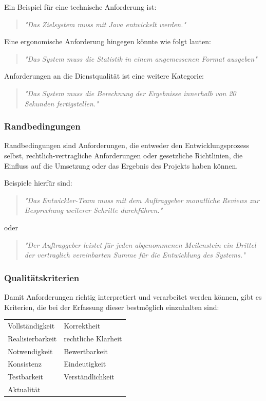 Ein Beispiel für eine technische Anforderung ist:
\begin{quote}
\textit{"Das Zielsystem muss mit Java entwickelt werden."}
\end{quote}
Eine ergonomische Anforderung hingegen könnte wie folgt lauten:
\begin{quote}
\textit{"Das System muss die Statistik in einem angemessenen Format ausgeben"}
\end{quote}

Anforderungen an die Dienstqualität ist eine weitere Kategorie:
\begin{quote}
\textit{"Das System muss die Berechnung der Ergebnisse innerhalb von 20 Sekunden fertigstellen."}
\end{quote}


\subsubsection{Randbedingungen}
\label{subsubsec:randbedingungen}
Randbedingungen sind Anforderungen, die entweder den Entwicklungsprozess selbst, rechtlich-vertragliche Anforderungen oder gesetzliche Richtlinien, die Einfluss auf die Umsetzung oder das Ergebnis des Projekts haben können.

Beispiele hierfür sind:
\begin{quote}
\textit{"Das Entwickler-Team muss mit dem Auftraggeber monatliche Reviews zur Besprechung weiterer Schritte durchführen."}
\end{quote}
oder
\begin{quote}
\textit{"Der Auftraggeber leistet für jeden abgenommenen
Meilenstein ein Drittel der vertraglich vereinbarten Summe für die
Entwicklung des Systems."}
\end{quote}

\subsubsection{Qualitätskriterien}
Damit Anforderungen richtig interpretiert und verarbeitet werden können, gibt es Kriterien, die bei der Erfassung dieser bestmöglich einzuhalten sind: \\

\begin{tabular}{l l}
Vollständigkeit		&Korrektheit\\
Realisierbarkeit		&rechtliche Klarheit\\
Notwendigkeit		&Bewertbarkeit\\
Konsistenz			&Eindeutigkeit\\
Testbarkeit			&Verständlichkeit\\
Aktualität
\end{tabular}\\

